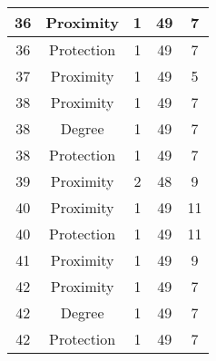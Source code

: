 \documentclass[results.tex]{subfiles}
\begin{document}
\begin{center}
\begin{tabular}{| c || c | c | c | c |}
            \hline
            36                      & Proximity                    & 1                      & 49                      & 7                    \\
            \hline
            36                      & Protection                   & 1                      & 49                      & 7                    \\
            \hline
            37                      & Proximity                    & 1                      & 49                      & 5                    \\
            \hline
            38                      & Proximity                    & 1                      & 49                      & 7                    \\
            \hline
            38                      & Degree                       & 1                      & 49                      & 7                    \\
            \hline
            38                      & Protection                   & 1                      & 49                      & 7                    \\
            \hline
            39                      & Proximity                    & 2                      & 48                      & 9                    \\
            \hline
            40                      & Proximity                    & 1                      & 49                      & 11                   \\
            \hline
            40                      & Protection                   & 1                      & 49                      & 11                   \\
            \hline
            41                      & Proximity                    & 1                      & 49                      & 9                    \\
            \hline
            42                      & Proximity                    & 1                      & 49                      & 7                    \\
            \hline
            42                      & Degree                       & 1                      & 49                      & 7                    \\
            \hline
            42                      & Protection                   & 1                      & 49                      & 7                    \\

\end{tabular}
\end{center}
\end{document}

